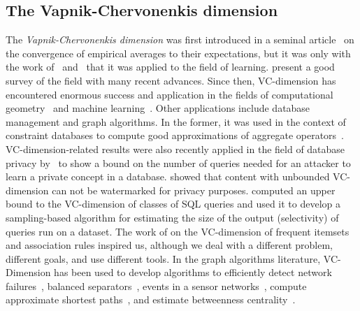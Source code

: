 \subsection{The Vapnik-Chervonenkis dimension}\label{sec:prevworkvc}
The {\em Vapnik-Chervonenkis dimension} was first introduced in a seminal
article~\citep{VapnikC71} on the convergence of empirical averages to their
expectations, but it was only with the work of~\citet{HausslerW86} and~\citet{BlumerEHW89} that it
was applied to the field of learning. \citet{BoucheronBL05} present a good survey
of the field with many recent advances. Since then, VC-dimension has encountered
enormous success and application in the fields of computational
geometry~\citep{Chazelle00,Matousek02} and machine
learning~\citep{AnthonyB99,DevroyeGL96}. Other applications include
database management and graph algorithms.
In the former, it was used in the
context of constraint databases to compute good approximations of aggregate
operators~\citep{BenediktL02}. VC-dimension-related
results were also recently applied in the field of database privacy
by~\citet{BlumLR08} to show a bound on the number of queries
needed for an attacker to learn a private concept in a database. \citet{Gross11}
showed that content with unbounded
VC-dimension can not be watermarked for privacy purposes.
\citet{RiondatoACZU11} computed an upper bound to the VC-dimension of
classes of SQL queries and used it to develop a sampling-based algorithm for
estimating the size of the output (selectivity) of queries run on a dataset.
The work of \citet{RiondatoU12} on the VC-dimension of frequent itemsets and
association rules inspired us, although we deal with a different problem,
different goals, and use different tools. In the graph algorithms literature,
VC-Dimension has been used to develop algorithms to efficiently detect network
failures~\citep{Kleinberg03,KleinbergSS08}, balanced separators~\citep{FeigeM06},
events in a sensor networks~\citep{GandhiSW10}, compute approximate shortest
paths~\citep{AbrahamDFGW11}, and estimate betweenness
centrality~\citep{RiondatoK14}.


